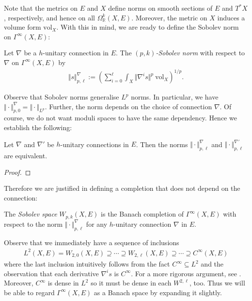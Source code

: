 \documentclass[12pt]{ociamthesis}  %
\begin{document}
Note that the metrics on $E$ and $X$ define norms on smooth sections
of $E$ and $T^*X$, respectively, and hence on all
$\Omega^k_{\mathbb{R}}(X,E)$.
Moreover, the metric on $X$ induces a volume form $\text{vol}_X$.
With this in mind, we are ready to define the Sobolev norm on
$\Gamma^\infty(X,E)$:

\begin{definition}
  Let $\nabla$ be a $h$-unitary connection in $E$.
  The \emph{$(p,k)$-Sobolev norm} with respect to $\nabla$ on
  $\Gamma^\infty(X,E)$ by
  \begin{align*}
    \Vert s\Vert_{p,\ell}^\nabla := \left(
    \sum_{i=0}^\ell \int_X \Vert \nabla^i s \Vert^p\:\text{vol}_X
    \right)^{1/p}.
  \end{align*}
\end{definition}

Observe that Sobolev norms generalise $L^p$ norms. In particular,
we have $\Vert\cdot\Vert^\nabla_{p,0} = \Vert\cdot\Vert_{L^p}$.
Further, the norm depends on the choice of connection $\nabla$. Of
course, we do not want moduli spaces to have the same dependency. Hence
we establish the following:
\begin{lemma}
  Let $\nabla$ and $\nabla'$ be $h$-unitary connections in $E$. Then the
  norms $\Vert\cdot\Vert_{p,\ell}^\nabla$ and
  $\Vert\cdot\Vert_{p,\ell}^{\nabla'}$ are equivalent.
  \begin{proof}
    \missingproof
  \end{proof}
\end{lemma}

Therefore we are justified in defining a completion that does not depend
on the connection:

\begin{definition}
  The \emph{Sobolev space} $W_{p,k}(X,E)$ is the Banach completion of
  $\Gamma^\infty(X,E)$ with respect to the norm
  $\Vert\cdot\Vert_{p,\ell}^\nabla$ for any $h$-unitary connection
  $\nabla$ in $E$.
\end{definition}

Observe that we immediately have a sequence of inclusions
\begin{align*}
  L^2(X,E) =
  W_{2,0}(X,E) \supseteq
  \cdots \supseteq
  W_{2,\ell}(X,E) \supseteq
  \cdots
  \supseteq
  C^\infty(X,E)
\end{align*}
where the last inclusion intuitively follows from the fact
$C^\infty \subseteq L^2$ and the observation that each derivative
$\nabla^i s$ is $C^\infty$. For a more rigorous argument, see
\cite[Corollary 3.8.3]{bc2009}.
Moreover, $C^\infty$ is dense in $L^2$ so it must be dense in each
$W^{2,\ell}$, too. Thus we will be able to regard $\Gamma^\infty(X,E)$
as a Banach space by expanding it slightly.
\end{document}
